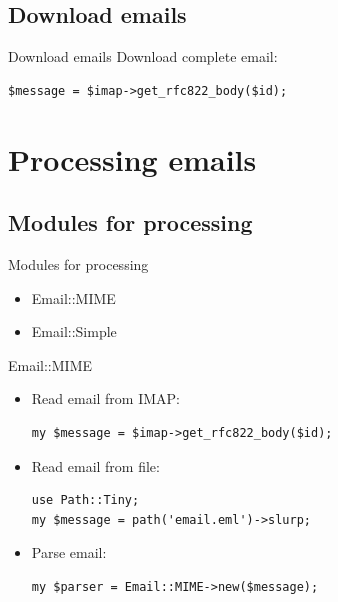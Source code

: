 \subsection{Download emails}

\begin{frame}[fragile]{Download emails}
  Download complete email:

\begin{verbatim}
$message = $imap->get_rfc822_body($id);
\end{verbatim}

\end{frame}

\section{Processing emails}

\subsection{Modules for processing}

\begin{frame}{Modules for processing}
  \begin{itemize}
  \item Email::MIME
  \item Email::Simple
  \end{itemize}
\end{frame}

\begin{frame}[fragile]{Email::MIME}
  \begin{itemize}
    \item Read email from IMAP:

\begin{verbatim}
my $message = $imap->get_rfc822_body($id);
\end{verbatim}

  \item Read email from file:

\begin{verbatim}
use Path::Tiny;
my $message = path('email.eml')->slurp;
\end{verbatim}

  \item Parse email:

\begin{verbatim}
my $parser = Email::MIME->new($message);
\end{verbatim}

\end{itemize}  
\end{frame}

